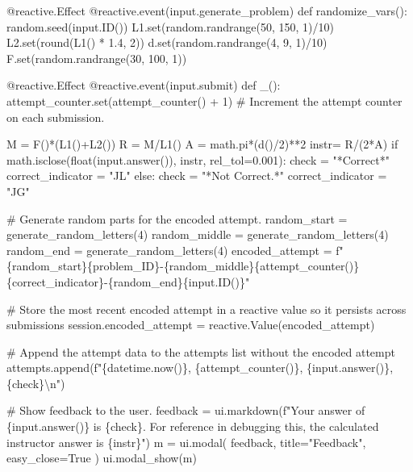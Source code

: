 \documentclass[
  letterpaper,
  DIV=11,
  numbers=noendperiod]{scrreprt}
\newenvironment{Shaded}{\begin{snugshade}}{\end{snugshade}}
\newcommand{\NormalTok}[1]{\textcolor[rgb]{0.00,0.23,0.31}{#1}}
\begin{document}
\begin{Shaded}
\begin{Highlighting}[]
\NormalTok{    @reactive.Effect}
\NormalTok{    @reactive.event(input.generate\_problem)}
\NormalTok{    def randomize\_vars():}
\NormalTok{        random.seed(input.ID())}
\NormalTok{        L1.set(random.randrange(50, 150, 1)/10)}
\NormalTok{        L2.set(round(L1() * 1.4, 2))}
\NormalTok{        d.set(random.randrange(4, 9, 1)/10)}
\NormalTok{        F.set(random.randrange(30, 100, 1))}

\NormalTok{    @reactive.Effect}
\NormalTok{    @reactive.event(input.submit)}
\NormalTok{    def \_():}
\NormalTok{        attempt\_counter.set(attempt\_counter() + 1)  \# Increment the attempt counter on each submission.}
    
\NormalTok{        M = F()*(L1()+L2())}
\NormalTok{        R = M/L1()}
\NormalTok{        A = math.pi*(d()/2)**2}
\NormalTok{        instr= R/(2*A)}
\NormalTok{        if math.isclose(float(input.answer()), instr, rel\_tol=0.001):}
\NormalTok{            check = "*Correct*"}
\NormalTok{            correct\_indicator = "JL"}
\NormalTok{        else:}
\NormalTok{            check = "*Not Correct.*"}
\NormalTok{            correct\_indicator = "JG"}

\NormalTok{        \# Generate random parts for the encoded attempt.}
\NormalTok{        random\_start = generate\_random\_letters(4)}
\NormalTok{        random\_middle = generate\_random\_letters(4)}
\NormalTok{        random\_end = generate\_random\_letters(4)}
\NormalTok{        encoded\_attempt = f"\{random\_start\}\{problem\_ID\}{-}\{random\_middle\}\{attempt\_counter()\}\{correct\_indicator\}{-}\{random\_end\}\{input.ID()\}"}

\NormalTok{        \# Store the most recent encoded attempt in a reactive value so it persists across submissions}
\NormalTok{        session.encoded\_attempt = reactive.Value(encoded\_attempt)}

\NormalTok{        \# Append the attempt data to the attempts list without the encoded attempt}
\NormalTok{        attempts.append(f"\{datetime.now()\}, \{attempt\_counter()\}, \{input.answer()\}, \{check\}\textbackslash{}n")}

\NormalTok{        \# Show feedback to the user.}
\NormalTok{        feedback = ui.markdown(f"Your answer of \{input.answer()\} is \{check\}. For reference in debugging this, the calculated instructor answer is \{instr\}")}
\NormalTok{        m = ui.modal(}
\NormalTok{            feedback,}
\NormalTok{            title="Feedback",}
\NormalTok{            easy\_close=True}
\NormalTok{        )}
\NormalTok{        ui.modal\_show(m)}


\end{Highlighting}
\end{Shaded}
\end{document}

